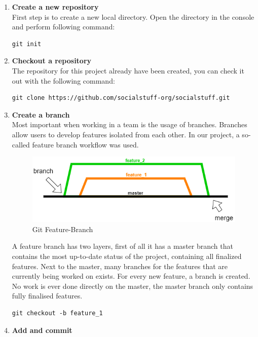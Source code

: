 \begin{enumerate}
    \item \textbf{Create a new repository} \\
    First step is to create a new local directory. Open the directory in the console and perform following command:
    \begin{lstlisting}[label={lst:lstlisting2}]
		git init
    \end{lstlisting}
    \item \textbf{Checkout a repository} \\
    The repository for this project already have been created, you can check it out with the following command:
    \begin{lstlisting}[label={lst:lstlisting2}]
		git clone https://github.com/socialstuff-org/socialstuff.git
    \end{lstlisting}
    \item \textbf{Create a branch} \\
    Most important when working in a team is the usage of branches. Branches allow users to develop features isolated from each other. In our project, a so-called feature branch workflow was used.
    \begin{figure}[h]
        \centering
        \includegraphics[width=1.0\textwidth]{./images/git_branching}
        \caption{Git Feature-Branch}
        \label{fig:gitbranching}
    \end{figure}
    A feature branch has two layers, first of all it has a master branch that contains the most up-to-date status of the project, containing all finalized features. Next to the master, many branches for the features that are currently being worked on exists. For every new feature, a branch is created. No work is ever done directly on the master, the master branch only contains fully finalised features.
    \begin{lstlisting}[label={lst:lstlisting2}]
		git checkout -b feature_1
    \end{lstlisting}
    \item \textbf{Add and commit} \\

\end{enumerate}
